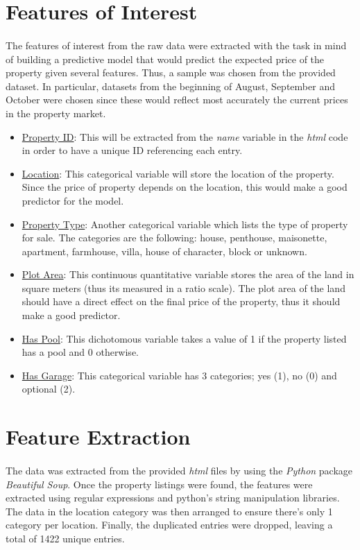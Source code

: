\section{Features of Interest}
\paragraph{ }The features of interest from the raw data were extracted with the task in mind of building a predictive model that would predict the expected price of the property given several features. Thus, a sample was chosen from the provided dataset. In particular, datasets from the beginning of August, September and October were chosen since these would reflect most accurately the current prices in the property market. 
\begin{itemize}
	\item \underline{Property ID}: This will be extracted from the \textit{name} variable in the \textit{html} code in order to have a unique ID referencing each entry.
	\item \underline{Location}: This categorical variable will store the location of the property. Since the price of property depends on the location, this would make a good predictor for the model.
	\item \underline{Property Type}: Another categorical variable which lists the type of property for sale. The categories are the following: house, penthouse, maisonette, apartment, farmhouse, villa, house of character, block or unknown.
	\item \underline{Plot Area}: This continuous quantitative variable stores the area of the land in square meters (thus its measured in a ratio scale). The plot area of the land should have a direct effect on the final price of the property, thus it should make a good predictor.
	\item \underline{Has Pool}: This dichotomous variable takes a value of 1 if the property listed has a pool and 0 otherwise.
	\item \underline{Has Garage}: This categorical variable has 3 categories; yes (1), no (0) and optional (2).
\end{itemize}

\section{Feature Extraction}
\paragraph{ }The data was extracted from the provided \textit{html} files by using the \textit{Python} package \textit{Beautiful Soup}. Once the property listings were found, the features were extracted using regular expressions and python's string manipulation libraries. The data in the location category was then arranged to ensure there's only 1 category per location. Finally, the duplicated entries were dropped, leaving a total of 1422 unique entries.

